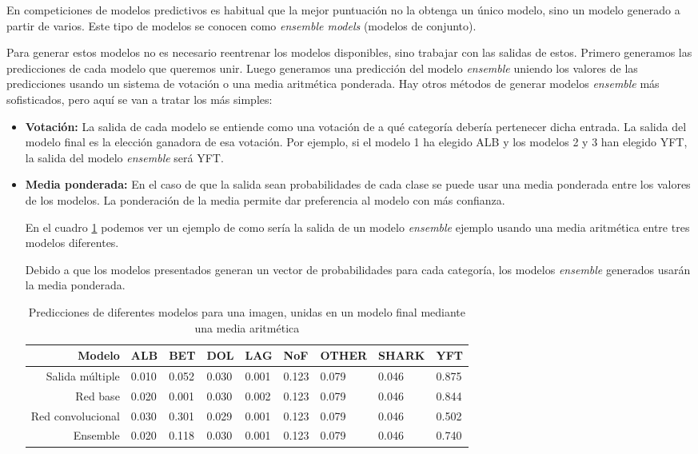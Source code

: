 En competiciones de modelos predictivos es habitual que la mejor puntuación
no la obtenga un único modelo, sino un modelo generado a partir de varios. Este
tipo de modelos se conocen como \textit{ensemble models} (modelos de conjunto).

Para generar estos modelos no es necesario reentrenar los modelos disponibles, sino
trabajar con las salidas de estos. Primero generamos las predicciones de cada
modelo que queremos unir. Luego generamos una predicción del modelo
\textit{ensemble} uniendo los valores de las predicciones usando un sistema de
votación o una media aritmética ponderada. Hay otros métodos de generar modelos
\textit{ensemble} más sofisticados, pero aquí se van a tratar los más simples:

\begin{itemize}
    \item{\textbf{Votación:} La salida de cada modelo se entiende como una
            votación de a qué categoría debería pertenecer dicha entrada. La
            salida del modelo final es la elección ganadora de esa votación. Por
            ejemplo, si el modelo 1 ha elegido ALB y los modelos 2 y 3 han
        elegido YFT, la salida del modelo \textit{ensemble} será YFT.}
    \item{\textbf{Media ponderada:} En el caso de que la salida sean
            probabilidades de cada clase se puede  usar una media ponderada
            entre los valores de los modelos. La ponderación de la media permite
            dar preferencia al modelo con más confianza.
            
            En el cuadro \ref{ensemble_sample} podemos ver un ejemplo de como
        sería la salida de un modelo \textit{ensemble} ejemplo usando una media
    aritmética entre tres modelos diferentes.}

Debido a que los modelos presentados generan un vector de probabilidades para
cada categoría, los modelos \textit{ensemble} generados usarán la media
ponderada.

\begin{table}[]
\centering
\caption{Predicciones de diferentes modelos para una imagen, unidas en un modelo
final mediante una media aritmética}
\label{ensemble_sample}
\begin{tabular}{rllllllll}
Modelo              & ALB   & BET   & DOL   & LAG   & NoF   & OTHER & SHARK  & YFT  \\
\hline
Salida múltiple     & 0.010 & 0.052 & 0.030 & 0.001 & 0.123 & 0.079 & 0.046 & 0.875\\
Red base            & 0.020 & 0.001 & 0.030 & 0.002 & 0.123 & 0.079 & 0.046 & 0.844\\
Red convolucional   & 0.030 & 0.301 & 0.029 & 0.001 & 0.123 & 0.079 & 0.046 & 0.502\\
\hline
Ensemble            & 0.020 & 0.118 & 0.030 & 0.001 & 0.123 & 0.079 & 0.046 & 0.740
\end{tabular}
\end{table}


\end{itemize}
